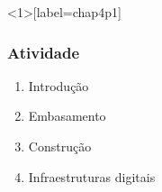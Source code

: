 \documentclass[aspectratio=43,8pt]{beamer}%
\begin{document}
\begin{frame}<1>[label=chap4p1]
	\frametitle{Atividade}
	\begin{keypoint}
		
		\begin{enumerate}
			\item Introdução 
\pause
			\item Embasamento 	
\pause
					\item Construção 
\pause
					\item Infraestruturas digitais
\pause
		\end{enumerate} 
	\end{keypoint}
\end{frame}
\end{document}
